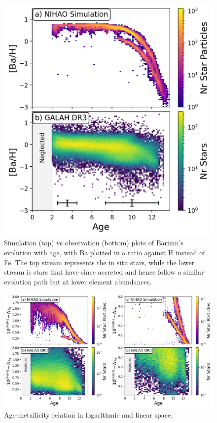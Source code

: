 \documentclass[fleqn,usenatbib]{mnras}
\begin{document}
\begin{figure}
	\includegraphics[width=\columnwidth]{figures/Ba_H_time.png}
    \caption{Simulation (top) vs observation (bottom) plots of Barium's evolution with age, with Ba plotted in a ratio against H instead of Fe. The top stream represents the in situ stars, while the lower stream is stars that have since accreted and hence follow a similar evolution path but at lower element abundances.}
    \label{fig:BaHtime}
\end{figure}
\begin{figure}
	\includegraphics[width=\columnwidth]{figures/Fe_H_lin_time.png}
    \caption{Age-metallicity relation in logarithmic and linear space.}
    \label{fig:Fe_H_lin_time}
\end{figure}
\end{document}
